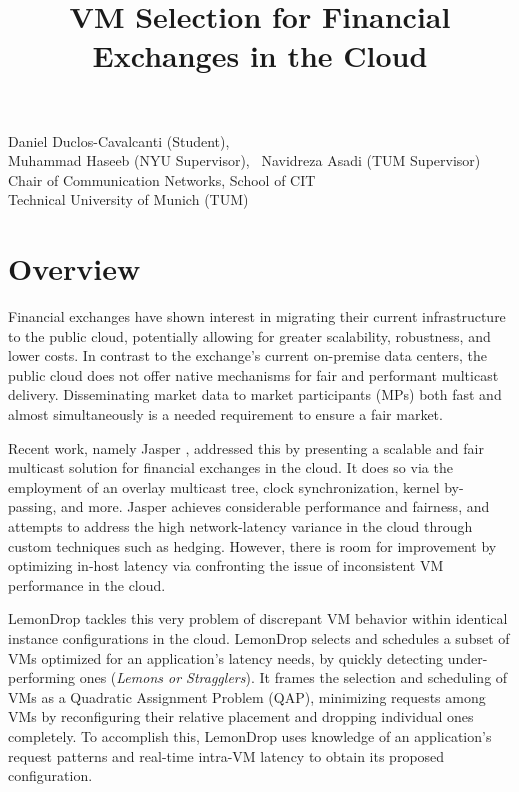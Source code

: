 \documentclass{article}
\title{VM Selection for Financial Exchanges in the Cloud}
\makeatletter
\renewcommand{\maketitle}{%
    \thispagestyle{fancy}%
    \begin{center}
        \Large\bfseries\@title
    \end{center}
    \vspace{-0.25cm}
    \begin{center}
        Daniel Duclos-Cavalcanti (Student),
        \\
        Muhammad Haseeb (NYU Supervisor),
        ~Navidreza Asadi (TUM Supervisor) 
        \\Chair of Communication Networks, School of CIT
        \\Technical University of Munich (TUM)
    \end{center}
}
\makeatother
\begin{document}
\maketitle

\section{Overview}

Financial exchanges have shown interest in migrating their current infrastructure 
to the public cloud, potentially allowing for greater scalability, robustness, and lower costs.
In contrast to the exchange's current on-premise data centers, the public cloud does not 
offer native mechanisms for fair and performant multicast delivery. Disseminating market data 
to market participants (MPs) both fast and almost simultaneously is a needed requirement to ensure a fair market.

Recent work, namely Jasper \cite{haseeb2024jasper}, addressed this by presenting a scalable and fair multicast 
solution for financial exchanges in the cloud. It does so via the employment of an overlay multicast tree, 
clock synchronization, kernel by-passing, and more. Jasper achieves considerable performance and fairness, 
and attempts to address the high network-latency variance in the cloud through custom techniques such as hedging. 
However, there is room for improvement by optimizing in-host latency via confronting the issue of inconsistent VM performance in the cloud.

LemonDrop \cite{sachidananda2022scheduling} tackles this very problem of discrepant VM behavior 
within identical instance configurations in the cloud. LemonDrop selects and schedules 
a subset of VMs optimized for an application's latency needs, by quickly detecting under-performing ones (\textit{Lemons or Stragglers}).
It frames the selection and scheduling of VMs as a Quadratic Assignment Problem (QAP), minimizing requests among VMs
by reconfiguring their relative placement and dropping individual ones completely. 
To accomplish this, LemonDrop uses knowledge of an application's request patterns and real-time intra-VM latency to obtain its proposed configuration.

\end{document}
